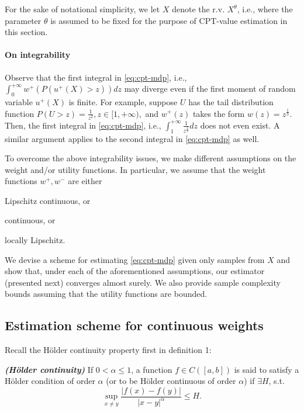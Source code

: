 For the sake of notational simplicity, we let $X$ denote the r.v. $X^\theta$, i.e., where the parameter $\theta$ is assumed to be fixed for the purpose of CPT-value estimation in this section. 

\paragraph{On integrability}
Observe that the first integral in \eqref{eq:cpt-mdp}, i.e., 
$\int_0^{+\infty} w^+(P(u^+(X)>z)) d z$
may diverge even if the first moment of random variable $u^+(X)$ is finite. 
For example, suppose $U$ has the tail distribution function
$P(U>z)  = \frac{1}{z^2}, z\in [1, +\infty),$
 and $w^+(z)$ takes the form $w(z) = z^{\frac{1}{3}}$. Then, the first integral in \eqref{eq:cpt-mdp}, i.e.,
$
\int_1^{+\infty} \frac{1}{z^{\frac{2}{3}}} dz
$
does not even exist. A similar argument applies to the second integral in \eqref{eq:cpt-mdp} as well.

To overcome the above integrability issues, we make different assumptions on the weight and/or utility functions. In particular, we assume that the weight functions $w^+, w^-$ are either 
\begin{inparaenum}[\bfseries (i)]
\item Lipschitz continuous, or
\item \holder continuous, or
\item locally Lipschitz.
\end{inparaenum}
We devise a scheme for estimating \eqref{eq:cpt-mdp} given only samples from $X$ and show that, under each of the aforementioned assumptions, our estimator (presented next) converges almost surely. 
We also provide sample complexity bounds assuming that the utility functions are bounded.

\subsection{Estimation scheme for \holder continuous weights}
Recall the H\"{o}lder continuity property first in definition 1:
\begin{definition}\label{holder}
{\textbf{\textit{(H\"{o}lder continuity)}}}
If $0 < \alpha \leq 1$, a function $f \in C([a,b])$ is said to satisfy
a H\"{o}lder condition of order $\alpha$ (or to be H\"{o}lder continuous
of order $\alpha$) if $\exists H$, s.t.
\[
\sup_{x \neq y} \frac{| f(x) - f(y) |}{| x-y |^{\alpha}} \leq H .
\]
\end{definition}

